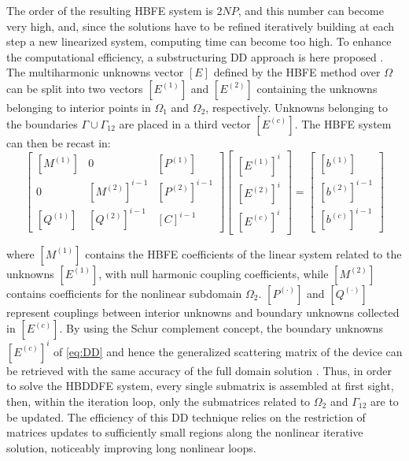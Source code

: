 \documentclass[journal,twoside]{IEEEtran}
\begin{document}
The order of the resulting HBFE system is $2 N P$, and
this number can become very high, and, since the
solutions have to be refined iteratively building at each step a new linearized
system, computing time can become too high.
To enhance the computational efficiency, a substructuring DD
approach is here proposed \cite{Guarnieri2010,Guarnieri2009}. The multiharmonic
unknowns vector $[E]$ defined by the HBFE method over $\Omega$ can be split
into two vectors $[E^{(1)}]$ and $[E^{(2)}]$ containing the unknowns belonging
to interior points in $\Omega_1$ and $\Omega_2$, respectively. Unknowns
belonging to the boundaries $\Gamma\cup\Gamma_{12}$ are placed in a third
vector $[E^{(c)}]$. The HBFE system can then be recast in:
%
\begin{equation}\label{eq:DD}
\begin{bmatrix}
 [M^{(1)}] &  \!\!0\!\!  &  [P^{(1)}] \\
 0  &  \!\![M^{(2)}]^{i-1}\!\! & [P^{(2)}]^{i-1} \\
 [Q^{(1)}] & \!\![Q^{(2)}]^{i-1}\!\! & [C]^{i-1}
\end{bmatrix}
\!\!\!\!
\begin{bmatrix}
{[E^{(1)}]^{i}} \\
{[E^{(2)}]^{i}} \\
{[E^{(c)}]^{i}}
\end{bmatrix} 
\!\!\!=\!\!\!
\begin{bmatrix}
{[b^{(1)}]} \\
{[b^{(2)}]}^{i-1} \\
{[b^{(c)}]}^{i-1}
\end{bmatrix} 
\end{equation}

\noindent where $[M^{(1)}]$ contains the HBFE coefficients of the linear system
related to the unknowns $[E^{(1)}]$, with
null harmonic coupling coefficients, while $[M^{(2)}]$ contains coefficients for
the nonlinear subdomain $\Omega_2$. ${[P^{(\cdot)}]}$ and ${[Q^{(\cdot)}]}$
represent couplings between interior unknowns and 
boundary unknowns collected in $[E^{(c)}]$. 
By using the Schur complement concept, the boundary unknowns $[E^{(c)}]^{i}$ of
\eqref{eq:DD} and hence the generalized scattering matrix of the device can be 
retrieved with the same accuracy of the full domain solution \cite{Guarnieri2009}.
Thus, in order to solve the HBDDFE system, 
every single submatrix is assembled at first sight, then, within the iteration
loop, only the submatrices related to $\Omega_2$ and $\Gamma_{12}$ are to be
updated. The efficiency of this DD technique relies on the restriction of matrices
updates to sufficiently small regions along the nonlinear iterative solution, 
noticeably improving long nonlinear loops.
\end{document}
